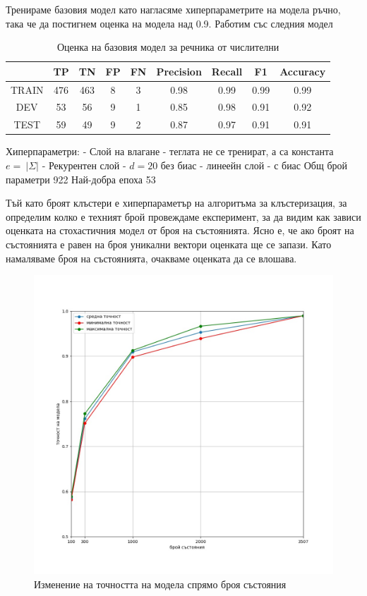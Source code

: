 \documentclass[a4paper,12pt]{article}
\begin{document}
Тренираме базовия модел като нагласяме хиперпараметрите на модела ръчно, така че да постигнем оценка на модела над 0.9. Работим със следния модел

\begin{table}[h!]
\centering
\begin{tabular}{|c|c|c|c|c|c|c|c|c|}
\hline
 & TP & TN & FP & FN & Precision & Recall & F1 & Accuracy\\
\hline
TRAIN & 476 & 463 & 8 & 3 & 0.98 & 0.99 & 0.99 & 0.99\\
\hline
DEV & 53 & 56 & 9 & 1 & 0.85 & 0.98 & 0.91 & 0.92\\
\hline
TEST & 59 & 49 & 9 & 2 & 0.87 & 0.97 & 0.91 & 0.91\\
\hline
\end{tabular}
\caption{Оценка на базовия модел за речника от числителни}
\label{table:2}
\end{table}

Хиперпараметри:
- Слой на влагане - теглата не се тренират, а са константа $e =\:|\Sigma|$ 
- Рекурентен слой - $d = 20$ без биас
- линеейн слой - с биас 
Общ брой параметри  922
Най-добра епоха 53

Тъй като броят клъстери е хиперпараметър на алгоритъма за клъстеризация, за определим колко е техният брой провеждаме експеримент, за да видим как зависи оценката на стохастичния модел от броя на състоянията. Ясно е, че ако броят на състоянията е равен на броя уникални вектори оценката ще се запази. Като намаляваме броя на състоянията, очакваме оценката да се влошава. 

\begin{figure}[H]
  \centering
  \includegraphics[width=\textwidth,height=\textheight,keepaspectratio]{figures/number-of-states-accuracy.jpg}
  \caption{Изменение на точността на модела спрямо броя състояния}
\end{figure}
\end{document}
